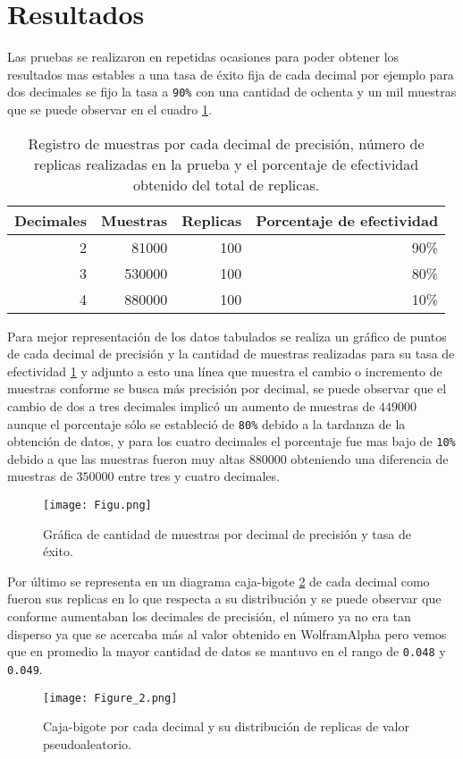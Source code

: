 \documentclass[a4paper, 11pt]{article}
\begin{document}
\section{Resultados}
Las pruebas se realizaron en repetidas ocasiones para poder obtener los resultados mas estables a una tasa de éxito fija de cada decimal por ejemplo para dos decimales se fijo la tasa a \texttt{90\%} con una cantidad de ochenta y un mil muestras que se puede observar en el cuadro \ref{tab1}. 
    \begin{table}[H]
        \caption{Registro de muestras por cada decimal de precisión, número de replicas realizadas en la prueba y el porcentaje de efectividad obtenido del total de replicas.}
        \bigskip
        \label{tab1}
        \centering
        \begin{tabular}{|r|r|r|r|}
        \hline
         Decimales&Muestras&Replicas&Porcentaje de efectividad  \\
        \hline
        2 & 81000 & 100 & 90\%  \\
        \hline
        3 & 530000  & 100 & 80\%  \\
        \hline
        4 & 880000  & 100 & 10\% \\
        \hline
        \end{tabular}
    \end{table}
\bigskip

Para mejor representación de los datos tabulados se realiza un gráfico de puntos de cada decimal de precisión y la cantidad de muestras realizadas para su tasa de efectividad \ref{f3} y adjunto a esto una línea que muestra el cambio o incremento de muestras conforme se busca más precisión por decimal, se puede observar que el cambio de dos a tres decimales implicó un aumento de muestras de \texttt{$449000$} aunque el porcentaje sólo se estableció de \texttt{80\%} debido a la tardanza de la obtención de datos, y para los cuatro decimales el porcentaje fue mas bajo de \texttt{10\%} debido a que las muestras fueron muy altas \texttt{$880000$} obteniendo una diferencia de muestras de \texttt{$350000$} entre tres y cuatro decimales.
\begin{figure}[H]
  \centering      
  \texttt{[image: Figu.png]}
  \caption{Gráfica de cantidad de muestras por decimal de precisión y tasa de éxito.}
  \label{f3}
\end{figure}

\bigskip

Por último se representa en un diagrama caja-bigote \ref{f2} de cada decimal como fueron sus replicas en lo que respecta a su distribución y se puede observar que conforme aumentaban los decimales de precisión, el número ya no era tan disperso ya que se acercaba más al valor obtenido en WolframAlpha pero vemos que en promedio la mayor cantidad de datos se mantuvo en el rango de \texttt{0.048} y \texttt{0.049}.
\begin{figure}[H]
  \centering      
  \texttt{[image: Figure\_2.png]}
  \caption{Caja-bigote por cada decimal y su distribución de replicas de valor pseudoaleatorio.}
  \label{f2}
\end{figure}
\bigskip
\bigskip



\end{document}
